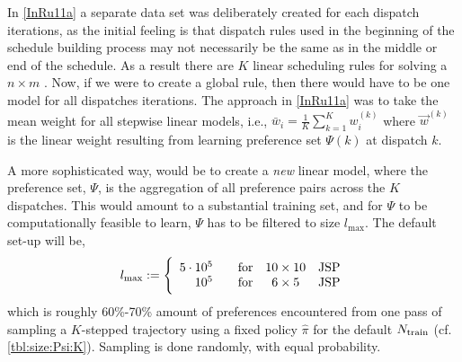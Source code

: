 In \cref{InRu11a} a separate data set was deliberately created for each 
dispatch iterations, as the initial feeling is that dispatch rules used in the 
beginning of the schedule building process may not necessarily be the same as 
in the middle or end of the schedule. As a result there are $K$ linear 
scheduling rules for solving a $n \times m$ \jsp. 
Now, if we were to create a global rule, then there would have to be one 
model for all dispatches iterations. The approach in \cref{InRu11a} was to take 
the mean weight for all stepwise linear models, i.e., 
$\bar{w}_i=\frac{1}{K}\sum_{k=1}^K w_i^{(k)}$ where $\vec{w}^{(k)}$ is 
the linear weight resulting from learning preference set $\Psi(k)$ at 
dispatch $k$. 

A more sophisticated way, would be to create a \emph{new} linear model, where 
the preference set, $\Psi$, is the aggregation  of all preference pairs across 
the $K$ dispatches. 
This would amount to a substantial training set, and for $\Psi$ to 
be computationally feasible to learn, $\Psi$ has to be filtered to size 
$l_{\max}$. The default set-up will be, 
\begin{equation}\label{eq:lmax}
l_{\max} := \Bigg \{ \begin{array}{rccc} 
5 \cdot 10^5 & \quad\text{for} & 10\times 10 & \text{\JSP} \\
10^5 & \quad\text{for} & 6\times 5 & \text{\JSP}
\end{array}
\end{equation}
which is roughly 60\%-70\% amount of preferences encountered from one pass of 
sampling a \mbox{$K$-stepped} trajectory using a fixed policy $\hat{\pi}$ for 
the default $N_{\text{train}}$ (cf. \cref{tbl:size:Psi:K}). 
Sampling is done randomly, with equal probability.


